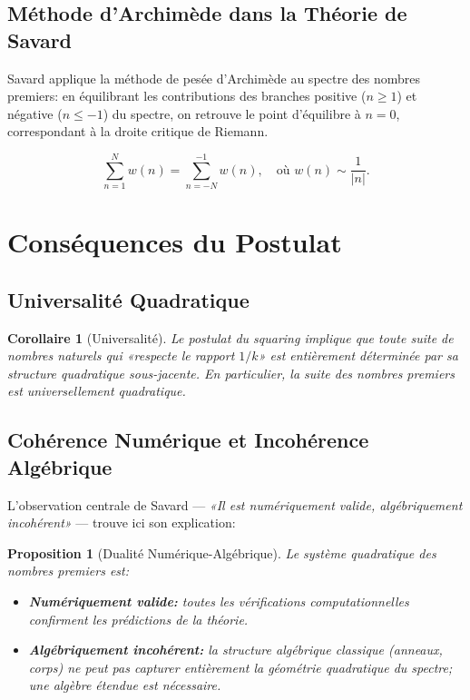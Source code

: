 \documentclass[12pt,a4paper]{article}
\newtheorem{proposition}{Proposition}
\newtheorem{corollaire}{Corollaire}
\begin{document}
\subsection{Méthode d'Archimède dans la Théorie de Savard}

Savard applique la méthode de pesée d'Archimède au spectre des nombres premiers:
en équilibrant les contributions des branches positive ($n \geq 1$) et négative
($n \leq -1$) du spectre, on retrouve le point d'équilibre à $n = 0$, correspondant
à la droite critique de Riemann.

\[
  \sum_{n=1}^{N} w(n) = \sum_{n=-N}^{-1} w(n), \quad \text{où } w(n) \sim \frac{1}{|n|}.
\]

\section{Conséquences du Postulat}

\subsection{Universalité Quadratique}

\begin{corollaire}[Universalité]
Le postulat du squaring implique que toute suite de nombres naturels qui «respecte
le rapport $1/k$» est entièrement déterminée par sa structure quadratique sous-jacente.
En particulier, la suite des nombres premiers est universellement quadratique.
\end{corollaire}

\subsection{Cohérence Numérique et Incohérence Algébrique}

L'observation centrale de Savard — \textit{«Il est numériquement valide, algébriquement
incohérent»} — trouve ici son explication:

\begin{proposition}[Dualité Numérique-Algébrique]
Le système quadratique des nombres premiers est:
\begin{itemize}
  \item \textbf{Numériquement valide:} toutes les vérifications computationnelles
        confirment les prédictions de la théorie.
  \item \textbf{Algébriquement incohérent:} la structure algébrique classique
        (anneaux, corps) ne peut pas capturer entièrement la géométrie quadratique
        du spectre; une algèbre étendue est nécessaire.
\end{itemize}
\end{proposition}
\end{document}
